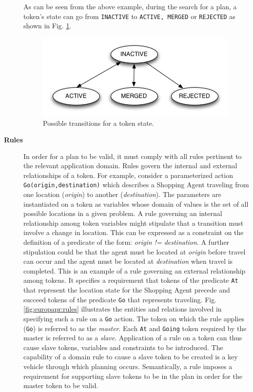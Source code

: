 \begin{description}
As can be seen from the above example, during the search for a plan, a
token's state can go from \texttt{INACTIVE} to \texttt{ACTIVE, MERGED}
or \texttt{REJECTED} as shown in Fig. \ref{fig:europapr:states}.

\begin{figure} \centering
  \includegraphics[scale=0.45]{figs/europa-pr-states.jpg}
  \caption{\small Possible transitions for a token state.}
\label{fig:europapr:states}
\end{figure}


\item[\textbf{Rules}] In order for a plan to be valid, it must comply
  with all rules pertinent to the relevant application domain. Rules
  govern the internal and external relationships of a token. For
  example, consider a parameterized action
  \texttt{Go(origin,destination)} which describes a Shopping Agent
  traveling from one location (\textit{origin}) to another
  (\textit{destination}). The parameters are instantiated on a token
  as variables whose domain of values is the set of all possible
  locations in a given problem. A rule governing an internal
  relationship among token variables might stipulate that a transition
  must involve a change in location. This can be expressed as a
  constraint on the definition of a predicate of the form:
  \textit{origin != destination}. A further stipulation could be that
  the agent must be located at \textit{origin} before travel can occur
  and the agent must be located at \textit{destination} when travel is
  completed. This is an example of a rule governing an external
  relationship among tokens. It specifies a requirement that tokens of
  the predicate \texttt{At} that represent the location state for the
  Shopping Agent precede and succeed tokens of the predicate
  \texttt{Go} that represents traveling. Fig. \ref{fig:europapr:rules}
  illustrates the entities and relations involved in specifying such a
  rule on a \texttt{Go} action. The token on which the rule applies
  (\texttt{Go}) is referred to as the \emph{master}. Each \texttt{At}
  and \texttt{Going} token required by the master is referred to as a
  \emph{slave}.  Application of a rule on a token  can thus cause slave tokens, variables and constraints to
  be introduced.  The capability of a domain rule to cause a slave
  token to be created is a key vehicle through which planning
  occurs. Semantically, a rule imposes a requirement for supporting
  slave tokens to be in the plan in order for the master token to be
  valid.


\end{description}
